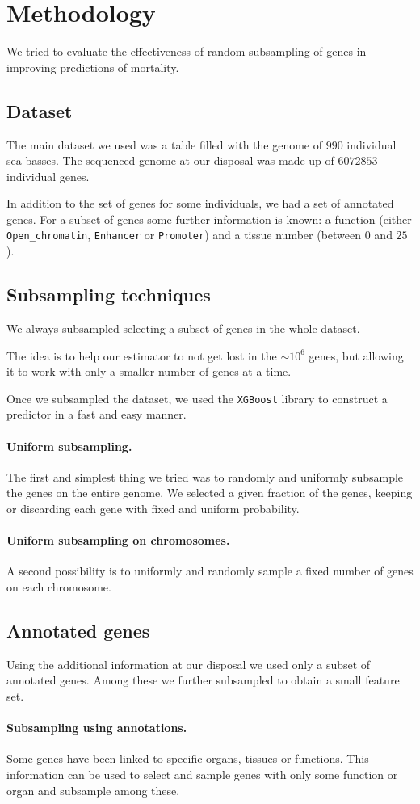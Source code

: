 \section{Methodology}
\label{sec:methods}
We tried to evaluate the effectiveness of random subsampling of genes in improving predictions of mortality.

\subsection{Dataset}
The main dataset we used was a table filled with the genome of $990$ individual sea basses.
The sequenced genome at our disposal was made up of $6072853$ individual genes.

In addition to the set of genes for some individuals, we had a set of annotated genes.
For a subset of genes some further information is known: a function (either \texttt{Open\_chromatin}, \texttt{Enhancer} or \texttt{Promoter}) and a tissue number (between $0$ and $25$).

\subsection{Subsampling techniques}
We always subsampled selecting a subset of genes in the whole dataset.

The idea is to help our estimator to not get lost in the $\sim 10^6$ genes, but allowing it to work with only a smaller number of genes at a time.

Once we subsampled the dataset,  we used the \texttt{XGBoost}\cite{xgboost} library to construct a predictor in a fast and easy manner. 

\paragraph{Uniform subsampling.}
The first and simplest thing we tried was to randomly and uniformly subsample the genes on the entire genome.
We selected a given fraction of the genes, keeping or discarding each gene with fixed and uniform probability.

\paragraph{Uniform subsampling on chromosomes.}
A second possibility is to uniformly and randomly sample a fixed number of genes on each chromosome.

\subsection{Annotated genes}
Using the additional information at our disposal we used only a subset of annotated genes. Among these we further subsampled to obtain a small feature set.

\paragraph{Subsampling using annotations.}
Some genes have been linked to specific organs, tissues or functions. This information can be used to select and sample genes with only some function or organ and subsample among these.
